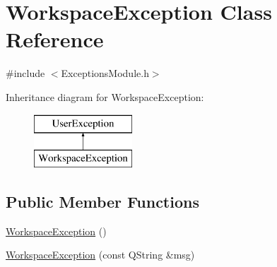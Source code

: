 \hypertarget{class_workspace_exception}{\section{Workspace\-Exception Class Reference}
\label{class_workspace_exception}
}


{\ttfamily \#include $<$Exceptions\-Module.\-h$>$}

Inheritance diagram for Workspace\-Exception\-:\begin{figure}[H]
\begin{center}
\leavevmode
\includegraphics[height=2.000000cm]{class_workspace_exception}
\end{center}
\end{figure}
\subsection*{Public Member Functions}
\begin{DoxyCompactItemize}
\item 
\hyperlink{class_workspace_exception_a6b512475f2c98d0fe5cc195a75fc6068}{Workspace\-Exception} ()
\item 
\hyperlink{class_workspace_exception_a454b50327eb01e166853dfedc5a27ca3}{Workspace\-Exception} (const Q\-String \&msg)
\end{DoxyCompactItemize}


